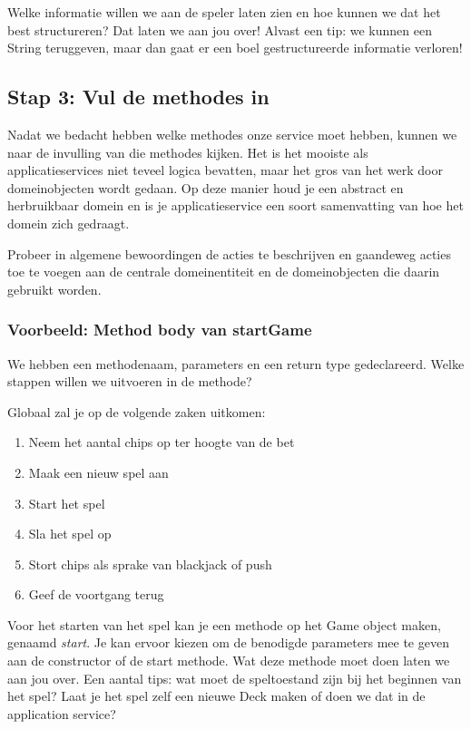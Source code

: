 Welke informatie willen we aan de speler laten zien
en hoe kunnen we dat het best structureren? Dat laten we aan jou over!
Alvast een tip: we kunnen een String teruggeven, 
maar dan gaat er een boel gestructureerde informatie verloren!

\subsection{Stap 3: Vul de methodes in}
Nadat we bedacht hebben welke methodes onze service moet hebben, 
kunnen we naar de invulling van die methodes kijken.
Het is het mooiste als applicatieservices niet teveel logica bevatten,
maar het gros van het werk door domeinobjecten wordt gedaan.
Op deze manier houd je een abstract en herbruikbaar domein en is je 
applicatieservice een soort samenvatting van hoe het domein zich gedraagt.

Probeer in algemene bewoordingen de acties te beschrijven 
en gaandeweg acties toe te voegen aan de centrale domeinentiteit
en de domeinobjecten die daarin gebruikt worden.

\subsubsection{Voorbeeld: Method body van startGame}
We hebben een methodenaam, parameters en een return type gedeclareerd.
Welke stappen willen we uitvoeren in de methode? 

Globaal zal je op de volgende zaken uitkomen:

\begin{enumerate}
    \item Neem het aantal chips op ter hoogte van de bet
    \item Maak een nieuw spel aan
    \item Start het spel
    \item Sla het spel op
    \item Stort chips als sprake van blackjack of push
    \item Geef de voortgang terug
\end{enumerate}

Voor het starten van het spel kan je een methode op het Game object maken,
genaamd \textit{start}. Je kan ervoor kiezen om de benodigde parameters mee te geven aan de 
constructor of de start methode. Wat deze methode moet doen laten we aan jou over.
Een aantal tips: wat moet de speltoestand zijn bij het beginnen van het spel?
Laat je het spel zelf een nieuwe Deck maken of doen we dat in de application service?

